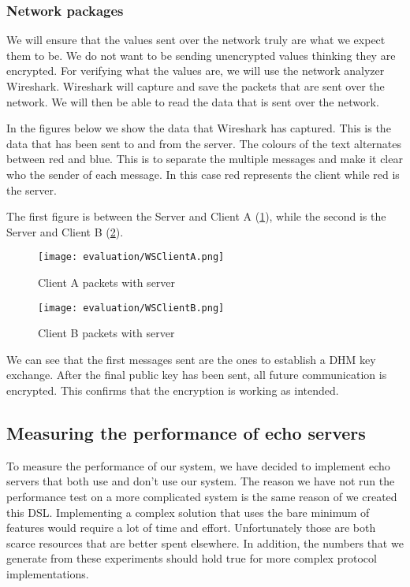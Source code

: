 \subsubsection{Network packages}
We will ensure that the values sent over the network truly are what we expect them to be. We do not want to be sending unencrypted values thinking they are encrypted.  For verifying what the values are, we will use the network analyzer Wireshark. Wireshark will capture and save the packets that are sent over the network. We will then be able to read the data that is sent over the network.

In the figures below we show the data that Wireshark has captured. This is the data that has been sent to and from the server. The colours of the text alternates between red and blue. This is to separate the multiple messages and make it clear who the sender of each message. In this case red represents the client while red is the server.

The first figure is between the Server and Client A (\ref{fig:wsclienta}), while the second is the Server and Client B (\ref{fig:wsclientb}).

\begin{figure}[H]
  \centering
  \texttt{[image: evaluation/WSClientA.png]}
  \caption{Client A packets with server}
  \label{fig:wsclienta}
\end{figure}

\begin{figure}[H]
  \centering
  \texttt{[image: evaluation/WSClientB.png]}
  \caption{Client B packets with server}
  \label{fig:wsclientb}
\end{figure}
We can see that the first messages sent are the ones to establish a DHM key exchange. After the final public key has been sent, all future communication is encrypted. This confirms that the encryption is working as intended.

\subsection{Measuring the performance of echo servers}
To measure the performance of our system, we have decided to implement echo servers that both use and don't use our system. The reason we have not run the performance test on a more complicated system is the same reason of we created this DSL. Implementing a complex solution that uses the bare minimum of features would require a lot of time and effort. Unfortunately those are both scarce resources that are better spent elsewhere. In addition, the numbers that we generate from these experiments should hold true for more complex protocol implementations. 

